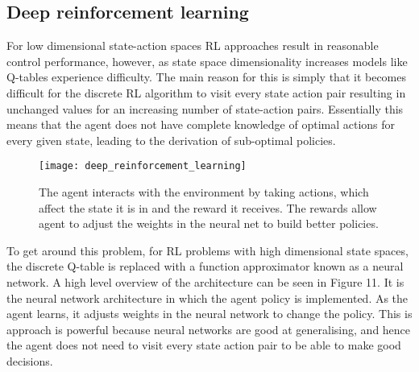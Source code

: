 \subsection{Deep reinforcement learning}
For low dimensional state-action spaces RL approaches result in reasonable control performance, however, as state space dimensionality increases models like Q-tables experience difficulty. The main reason for this is simply that it becomes difficult for the discrete RL algorithm to visit every state action pair resulting in unchanged values for an increasing number of state-action pairs. Essentially this means that the agent does not have complete knowledge of optimal actions for every given state, leading to the derivation of sub-optimal policies.
\begin{figure}[ht]
\centering
\texttt{[image: deep\_reinforcement\_learning]}
\caption{The agent interacts with the environment by taking actions, which affect the state it is in and the reward it receives. The rewards allow agent to adjust the weights in the neural net to build better policies.}
\end{figure}

To get around this problem, for RL problems with high dimensional state spaces, the discrete Q-table is replaced with a function approximator known as a neural network. A high level overview of the architecture can be seen in Figure 11. It is the neural network architecture in which the agent policy is implemented. As the agent learns, it adjusts weights in the neural network to change the policy. This is approach is powerful because neural networks are good at generalising, and hence the agent does not need to visit every state action pair to be able to make good decisions.